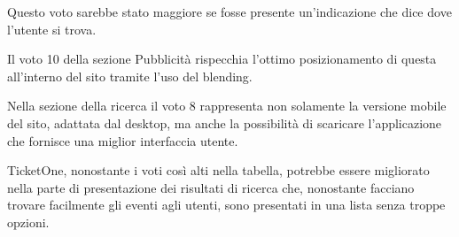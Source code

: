Questo voto sarebbe stato maggiore se fosse presente un'indicazione che dice dove l'utente si trova.
\par Il voto 10 della sezione Pubblicità rispecchia l'ottimo posizionamento di questa all'interno del sito tramite l'uso del blending.
\par Nella sezione della ricerca il voto 8 rappresenta non solamente la versione mobile del sito, adattata dal desktop, ma anche la possibilità di scaricare l'applicazione che fornisce una miglior interfaccia utente.
\par TicketOne, nonostante i voti così alti nella tabella, potrebbe essere migliorato nella parte di presentazione dei risultati di ricerca che, nonostante facciano trovare facilmente gli eventi agli utenti, sono presentati in una lista senza troppe opzioni.
